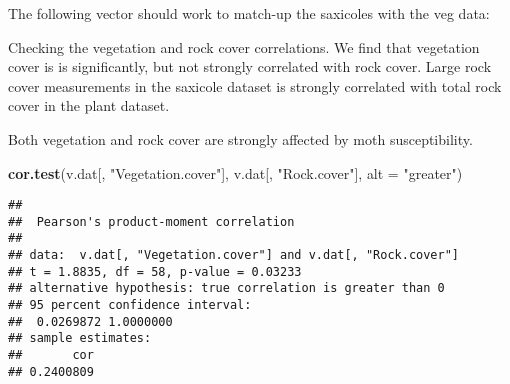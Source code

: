 \documentclass[]{article}
\newenvironment{Shaded}{\begin{snugshade}}{\end{snugshade}}
\newcommand{\KeywordTok}[1]{\textcolor[rgb]{0.13,0.29,0.53}{\textbf{#1}}}
\newcommand{\DataTypeTok}[1]{\textcolor[rgb]{0.13,0.29,0.53}{#1}}
\newcommand{\DecValTok}[1]{\textcolor[rgb]{0.00,0.00,0.81}{#1}}
\newcommand{\StringTok}[1]{\textcolor[rgb]{0.31,0.60,0.02}{#1}}
\newcommand{\ControlFlowTok}[1]{\textcolor[rgb]{0.13,0.29,0.53}{\textbf{#1}}}
\newcommand{\OperatorTok}[1]{\textcolor[rgb]{0.81,0.36,0.00}{\textbf{#1}}}
\newcommand{\NormalTok}[1]{#1}
\begin{document}
The following vector should work to match-up the saxicoles with the veg
data:

\begin{Shaded}
\end{Shaded}

Checking the vegetation and rock cover correlations. We find that
vegetation cover is is significantly, but not strongly correlated with
rock cover. Large rock cover measurements in the saxicole dataset is
strongly correlated with total rock cover in the plant dataset.

Both vegetation and rock cover are strongly affected by moth
susceptibility.

\begin{Shaded}
\begin{Highlighting}[]
\KeywordTok{cor.test}\NormalTok{(v.dat[, }\StringTok{"Vegetation.cover"}\NormalTok{], v.dat[, }\StringTok{"Rock.cover"}\NormalTok{], }\DataTypeTok{alt =} \StringTok{"greater"}\NormalTok{)}
\end{Highlighting}
\end{Shaded}

\begin{verbatim}
## 
##  Pearson's product-moment correlation
## 
## data:  v.dat[, "Vegetation.cover"] and v.dat[, "Rock.cover"]
## t = 1.8835, df = 58, p-value = 0.03233
## alternative hypothesis: true correlation is greater than 0
## 95 percent confidence interval:
##  0.0269872 1.0000000
## sample estimates:
##       cor 
## 0.2400809
\end{verbatim}
\end{document}
